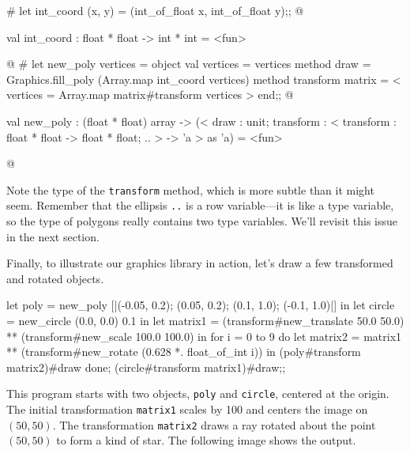 \begin{ocaml}
# let int_coord (x, y) = (int_of_float x, int_of_float y);;
@
\begin{topoutput}
val int_coord : float * float -> int * int = <fun>
\end{topoutput}
@
# let new_poly vertices =
object
   val vertices = vertices
   method draw = Graphics.fill_poly (Array.map int_coord vertices)
   method transform matrix = {< vertices = Array.map matrix#transform vertices >}
end;;
@
\begin{topoutput}
val new_poly :
  (float * float) array ->
  (< draw : unit;
     transform : < transform : float * float -> float * float; .. > -> 'a >
   as 'a) = <fun>
\end{topoutput}
@
\end{ocaml}
%
Note the type of the \hbox{\lstinline/transform/} method, which is more subtle than it might seem.
Remember that the ellipsis \hbox{\lstinline/../} is a row variable---it is like a type variable, so
the type of polygons really contains two type variables.  We'll revisit this issue in the next
section.

Finally, to illustrate our graphics library in action, let's draw a few transformed and rotated
objects.

\begin{ocaml}
let poly = new_poly [|(-0.05, 0.2); (0.05, 0.2); (0.1, 1.0); (-0.1, 1.0)|] in
let circle = new_circle (0.0, 0.0) 0.1 in
let matrix1 =
   (transform#new_translate 50.0 50.0) ** (transform#new_scale 100.0 100.0) in
   for i = 0 to 9 do
      let matrix2 = matrix1 ** (transform#new_rotate (0.628 *. float_of_int i)) in
      (poly#transform matrix2)#draw
   done;
   (circle#transform matrix1)#draw;;
\end{ocaml}
%
This program starts with two objects, \hbox{\lstinline/poly/} and \hbox{\lstinline/circle/}, centered at the
origin.  The initial transformation \hbox{\lstinline/matrix1/} scales by 100 and centers the image on $(50,
50)$.  The transformation \hbox{\lstinline/matrix2/} draws a ray rotated about the point $(50, 50)$ to form a
kind of star.  The following image shows the output.

